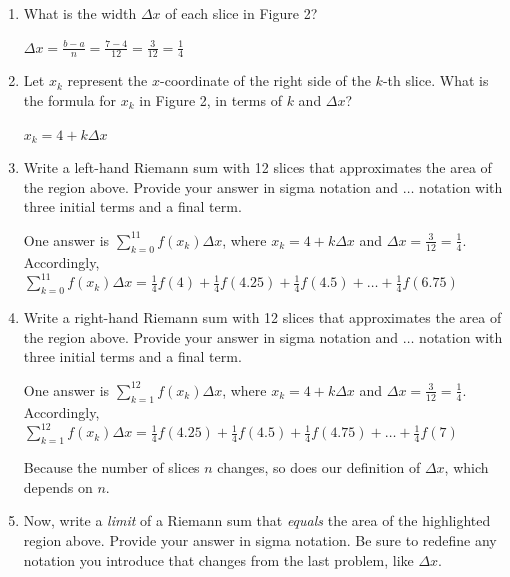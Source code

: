 \documentclass{article}
\begin{document}
\begin{enumerate}
\begin{center}
        
      \end{center}
      \begin{enumerate}
\begin{workshop}
    The answers to (a) and (b) follow formulas provided on the previous page.
\end{workshop}

\item What is the width $\Delta x $ of each slice in Figure 2?
\begin{solution}
    $\Delta x = \frac{b-a}{n}=\frac{7-4}{12}=\frac{3}{12}=\frac{1}{4}$
\end{solution}
\vfill
\item Let $x_k$ represent the $x$-coordinate of the right side of the $k$-th slice. What is the formula for $x_k$ in Figure 2, in terms of $k$ and $\Delta x$? 
\begin{solution}
    $x_k=4+k\Delta x$
\end{solution}
\vfill
\item Write a left-hand Riemann sum with 12 slices that approximates the area of the region above. Provide your answer in sigma notation and $\dots$ notation with three initial terms and a final term. 

\begin{solution}
One answer is $\displaystyle \sum_{k=0}^{11} f(x_k) \Delta x$, where $x_k=4+k\Delta x$ and $\Delta x=\frac{3}{12}=\frac{1}{4}$.
\newline
Accordingly, $\displaystyle \sum_{k=0}^{11} f(x_k) \Delta x=\frac{1}{4}f(4)+\frac{1}{4}f(4.25)+\frac{1}{4}f(4.5)+\dots+\frac{1}{4}f(6.75)$
\end{solution}
\vfill
\vfill
\vfill
\item Write a right-hand Riemann sum with 12 slices that approximates the area of the region above. Provide your answer in sigma notation and $\dots$ notation with three initial terms and a final term. 

\begin{solution}
One answer is $\displaystyle \sum_{k=1}^{12} f(x_k) \Delta x$, where $x_k=4+k\Delta x$ and $\Delta x=\frac{3}{12}=\frac{1}{4}$.
\newline
Accordingly, $\displaystyle \sum_{k=1}^{12} f(x_k) \Delta x=\frac{1}{4}f(4.25)+\frac{1}{4}f(4.5)+\frac{1}{4}f(4.75)+\dots+\frac{1}{4}f(7)$
\end{solution}
\vfill 
\vfill
\vfill
\begin{workshop}
    Because the number of slices $n$ changes, so does our definition of $\Delta x$, which depends on $n$.
\end{workshop}
\item Now, write a \textit{limit} of a Riemann sum that \textit{equals} the area of the highlighted region above. Provide your answer in sigma notation. Be sure to redefine any notation you introduce that changes from the last problem, like $\Delta x$.


\end{enumerate}
\end{enumerate}
\end{document}

